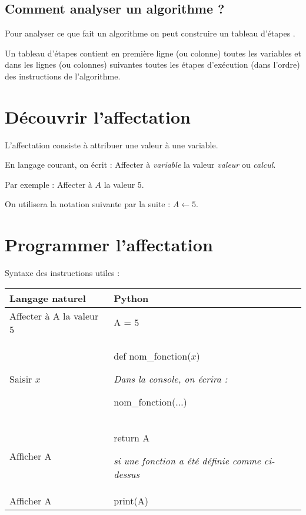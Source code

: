 \documentclass{article}
\begin{document}
\subsection{Comment analyser un algorithme ?}

Pour analyser ce que fait un algorithme on peut construire un \og tableau d'étapes \fg{}.

Un tableau d'étapes contient en première ligne (ou colonne) toutes les variables et dans  les lignes (ou colonnes) suivantes toutes les étapes d'exécution (dans l'ordre) des instructions de l'algorithme.

\section{Découvrir l'affectation}

\noindent L'affectation consiste à attribuer une valeur à une variable.

\noindent En langage courant, on écrit : Affecter à \textit{variable} la valeur \textit{valeur} ou \textit{calcul}.

\noindent Par exemple : Affecter à $ A $ la valeur $ 5 $.

\noindent On utilisera la notation suivante par la suite : $ A \gets 5 $.

\section{Programmer l'affectation}

Syntaxe des instructions utiles :

\medskip

{\renewcommand{\tabularxcolumn}[1]{%
>{{\centering\arraybackslash}}m{#1}}

\begin{center}
\begin{tabularx}{0.65\linewidth}{|X|X|}
\hline 
\textbf{Langage naturel} & \textbf{Python} \\ 
\hline 
Affecter à A la valeur 5 & A = 5 \\ 
\hline 
Saisir $ x $ & def nom\_{}fonction($ x $) \par \textit{Dans la console, on écrira :} \par nom\_{}fonction($ \ldots $) \\ 
\hline 
Afficher A & return A \par \textit{si une fonction a été définie comme ci-dessus} \\
\hline
Afficher A & print(A) \\
\hline
\end{tabularx}
\end{center}
}
\end{document}
